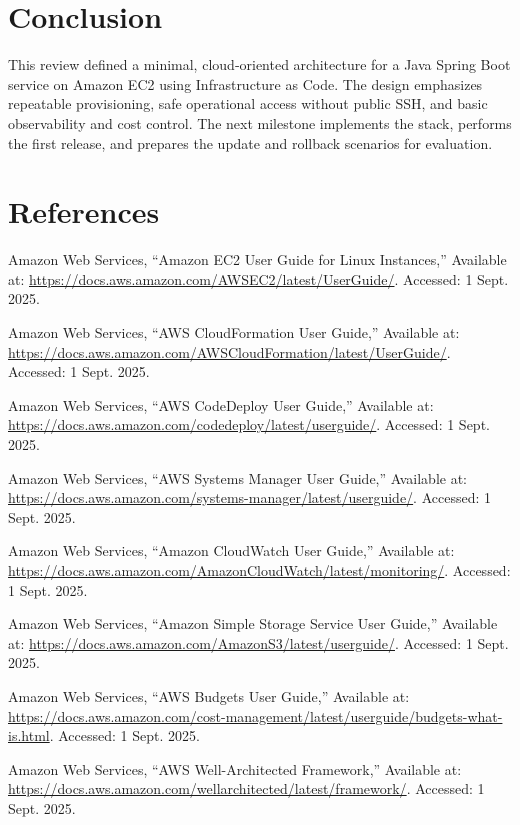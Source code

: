 \documentclass[12pt]{article}
\begin{document}
\section{Conclusion}\label{sec:conclusion}
This review defined a minimal, cloud‑oriented architecture for a Java Spring Boot service on Amazon EC2 using Infrastructure as Code. The design emphasizes repeatable provisioning, safe operational access without public SSH, and basic observability and cost control. The next milestone implements the stack, performs the first release, and prepares the update and rollback scenarios for evaluation.

\section*{References}
\begin{thebibliography}{9}

Amazon Web Services, ``Amazon EC2 User Guide for Linux Instances,'' Available at: \url{https://docs.aws.amazon.com/AWSEC2/latest/UserGuide/}. Accessed: 1 Sept. 2025.

Amazon Web Services, ``AWS CloudFormation User Guide,'' Available at: \url{https://docs.aws.amazon.com/AWSCloudFormation/latest/UserGuide/}. Accessed: 1 Sept. 2025.

Amazon Web Services, ``AWS CodeDeploy User Guide,'' Available at: \url{https://docs.aws.amazon.com/codedeploy/latest/userguide/}. Accessed: 1 Sept. 2025.

Amazon Web Services, ``AWS Systems Manager User Guide,'' Available at: \url{https://docs.aws.amazon.com/systems-manager/latest/userguide/}. Accessed: 1 Sept. 2025.

Amazon Web Services, ``Amazon CloudWatch User Guide,'' Available at: \url{https://docs.aws.amazon.com/AmazonCloudWatch/latest/monitoring/}. Accessed: 1 Sept. 2025.

Amazon Web Services, ``Amazon Simple Storage Service User Guide,'' Available at: \url{https://docs.aws.amazon.com/AmazonS3/latest/userguide/}. Accessed: 1 Sept. 2025.

Amazon Web Services, ``AWS Budgets User Guide,'' Available at: \url{https://docs.aws.amazon.com/cost-management/latest/userguide/budgets-what-is.html}. Accessed: 1 Sept. 2025.

Amazon Web Services, ``AWS Well-Architected Framework,'' Available at: \url{https://docs.aws.amazon.com/wellarchitected/latest/framework/}. Accessed: 1 Sept. 2025.

\end{thebibliography}
\end{document}
